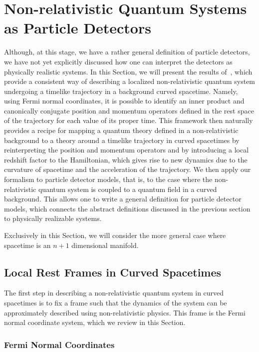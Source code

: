 \documentclass[letterpaper,12pt,titlepage,oneside,final]{book}
\begin{document}
\section{Non-relativistic Quantum Systems as Particle Detectors}\label{sec:NRLQS}

Although, at this stage, we have a rather general definition of particle detectors, we have not yet explicitly discussed how one can interpret the detectors as physically realistic systems. In this Section, we will present the results of~\cite{generalPD}, which 
provide a consistent way of describing a localized non-relativistic quantum system undergoing a timelike trajectory in a background curved spacetime. Namely, using Fermi normal coordinates, it is possible to identify an inner product and canonically conjugate position and momentum operators defined in the rest space of the trajectory for each value of its proper time. This framework then naturally provides a recipe for mapping a quantum theory defined in a non-relativistic background to a theory around a timelike trajectory in curved spacetimes by reinterpreting the position and momentum operators and by introducing a local redshift factor to the Hamiltonian, which gives rise to new dynamics due to the curvature of spacetime and the acceleration of the trajectory. We then apply our formalism to particle detector models, that is, to the case where the non-relativistic quantum system is coupled to a quantum field in a curved background. This allows one to write a general definition for particle detector models, which connects the abstract definitions discussed in the previous section to physically realizable systems.

Exclusively in this Section, we will consider the more general case where spacetime is an $n+1$ dimensional manifold.

\subsection{Local Rest Frames in Curved Spacetimes}\label{sub:FNC}

The first step in describing a non-relativistic quantum system in curved spacetimes is to fix a frame such that the dynamics of the system can be approximately described using non-relativistic physics. This frame is the Fermi normal coordinate system, which we review in this Section. 



\subsubsection*{Fermi Normal Coordinates}
\end{document}
